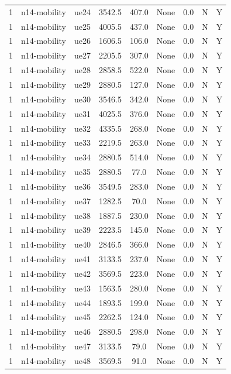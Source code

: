 \begin{table}[ht]
\begin{tabular}{|c|c|c|c|c|c|c|c|c|}
1 & n14-mobility & ue24 & 3542.5 & 407.0 & None & 0.0 & N & Y \\
1 & n14-mobility & ue25 & 4005.5 & 437.0 & None & 0.0 & N & Y \\
1 & n14-mobility & ue26 & 1606.5 & 106.0 & None & 0.0 & N & Y \\
1 & n14-mobility & ue27 & 2205.5 & 307.0 & None & 0.0 & N & Y \\
1 & n14-mobility & ue28 & 2858.5 & 522.0 & None & 0.0 & N & Y \\
1 & n14-mobility & ue29 & 2880.5 & 127.0 & None & 0.0 & N & Y \\
1 & n14-mobility & ue30 & 3546.5 & 342.0 & None & 0.0 & N & Y \\
1 & n14-mobility & ue31 & 4025.5 & 376.0 & None & 0.0 & N & Y \\
1 & n14-mobility & ue32 & 4335.5 & 268.0 & None & 0.0 & N & Y \\
1 & n14-mobility & ue33 & 2219.5 & 263.0 & None & 0.0 & N & Y \\
1 & n14-mobility & ue34 & 2880.5 & 514.0 & None & 0.0 & N & Y \\
1 & n14-mobility & ue35 & 2880.5 & 77.0 & None & 0.0 & N & Y \\
1 & n14-mobility & ue36 & 3549.5 & 283.0 & None & 0.0 & N & Y \\
1 & n14-mobility & ue37 & 1282.5 & 70.0 & None & 0.0 & N & Y \\
1 & n14-mobility & ue38 & 1887.5 & 230.0 & None & 0.0 & N & Y \\
1 & n14-mobility & ue39 & 2223.5 & 145.0 & None & 0.0 & N & Y \\
1 & n14-mobility & ue40 & 2846.5 & 366.0 & None & 0.0 & N & Y \\
1 & n14-mobility & ue41 & 3133.5 & 237.0 & None & 0.0 & N & Y \\
1 & n14-mobility & ue42 & 3569.5 & 223.0 & None & 0.0 & N & Y \\
1 & n14-mobility & ue43 & 1563.5 & 280.0 & None & 0.0 & N & Y \\
1 & n14-mobility & ue44 & 1893.5 & 199.0 & None & 0.0 & N & Y \\
1 & n14-mobility & ue45 & 2262.5 & 124.0 & None & 0.0 & N & Y \\
1 & n14-mobility & ue46 & 2880.5 & 298.0 & None & 0.0 & N & Y \\
1 & n14-mobility & ue47 & 3133.5 & 79.0 & None & 0.0 & N & Y \\
1 & n14-mobility & ue48 & 3569.5 & 91.0 & None & 0.0 & N & Y \\

\end{tabular}
\end{table}

